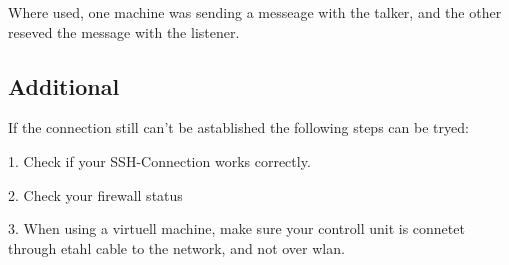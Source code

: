 Where used, one machine was sending a messeage with the talker, and the other reseved the message with the listener. 

\subsection{Additional}
If the connection still can't be astablished the following steps can be tryed:

1. Check if your SSH-Connection works correctly. 

2. Check your firewall status 

3. When using a virtuell machine, make sure your controll unit is connetet through etahl cable to the network, and not over wlan. 
